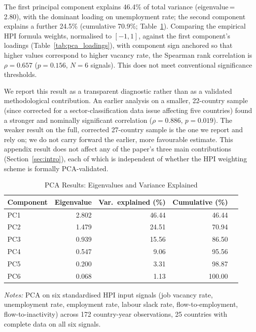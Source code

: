 \documentclass[12pt,a4paper]{article}
\begin{document}
The first principal component explains 46.4\% of total variance (eigenvalue\,=\,2.80),
with the dominant loading on unemployment rate; the second component explains a
further 24.5\% (cumulative 70.9\%; Table~\ref{tab:pca_eigen}).  Comparing the
empirical HPI formula weights, normalised to $[-1, 1]$, against the first
component's loadings (Table~\ref{tab:pca_loadings}), with component sign anchored
so that higher values correspond to higher vacancy rate, the Spearman rank
correlation is $\rho=0.657$ ($p=0.156$, $N=6$ signals).  This does not meet
conventional significance thresholds.

We report this result as a transparent diagnostic rather than as a validated
methodological contribution.  An earlier analysis on a smaller, 22-country sample
(since corrected for a sector-classification data issue affecting five countries)
found a stronger and nominally significant correlation ($\rho=0.886$, $p=0.019$).
The weaker result on the full, corrected 27-country sample is the one we report
and rely on; we do not carry forward the earlier, more favourable estimate.
This appendix result does not affect any of the paper's three main contributions
(Section~\ref{sec:intro}), each of which is independent of whether the HPI
weighting scheme is formally PCA-validated.

\begin{table}[htbp]
\caption{PCA Results: Eigenvalues and Variance Explained}
\label{tab:pca_eigen}
\begin{threeparttable}
\begin{tabular}{lrrrr}
\toprule
Component & Eigenvalue & Var.\ explained (\%) & Cumulative (\%) \\
\midrule
PC1 & 2.802 & 46.44 & 46.44 \\
PC2 & 1.479 & 24.51 & 70.94 \\
PC3 & 0.939 & 15.56 & 86.50 \\
PC4 & 0.547 &  9.06 & 95.56 \\
PC5 & 0.200 &  3.31 & 98.87 \\
PC6 & 0.068 &  1.13 & 100.00 \\
\bottomrule
\end{tabular}
\begin{tablenotes}
\footnotesize
\item \textit{Notes:} PCA on six standardised HPI input signals
  (job vacancy rate, unemployment rate, employment rate, labour slack rate,
  flow-to-employment, flow-to-inactivity) across 172 country-year observations,
  25 countries with complete data on all six signals.
\end{tablenotes}
\end{threeparttable}
\end{table}
\end{document}
